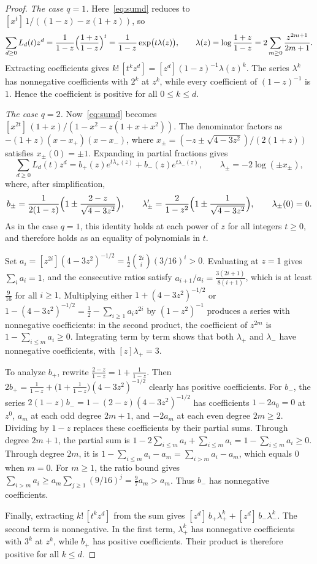 \documentclass[11pt]{amsart}
\theoremstyle{remark}
\begin{document}
\begin{proof}
\emph{The case $q=1$.} Here~\eqref{eq:sumd} reduces to
$[x^t]\,1/((1-z)-x(1+z))$, so
\[
 \sum_{d\ge0}L_d(t)z^d=\frac1{1-z}\Bigl(\frac{1+z}{1-z}\Bigr)^t
 =\frac1{1-z}\exp\bigl(t\lambda(z)\bigr),\qquad
 \lambda(z)=\log\frac{1+z}{1-z}=2\sum_{m\ge0}\frac{z^{2m+1}}{2m+1}.
\]
Extracting coefficients gives $k!\,[t^kz^d]=[z^d](1-z)^{-1}\lambda(z)^k$. The
series $\lambda^k$ has nonnegative coefficients with $2^k$ at $z^k$, while
every coefficient of $(1-z)^{-1}$ is $1$. Hence the coefficient is positive
for all $0\le k\le d$.

\emph{The case $q=2$.} Now~\eqref{eq:sumd} becomes
$[x^{2t}]\,(1+x)/(1-x^2-z(1+x+x^2))$. The denominator factors as
$-(1+z)(x-x_+)(x-x_-)$, where $x_\pm=(-z\pm\sqrt{4-3z^2})/(2(1+z))$ satisfies
$x_\pm(0)=\pm1$. Expanding in partial fractions gives
\[
 \sum_{d\ge0}L_d(t)z^d=b_+(z)e^{t\lambda_+(z)}+b_-(z)e^{t\lambda_-(z)},\qquad
 \lambda_\pm=-2\log(\pm x_\pm),
\]
where, after simplification,
\[
 b_\pm=\frac{1}{2(1-z)}\Bigl(1\pm\frac{2-z}{\sqrt{4-3z^2}}\Bigr),\qquad
 \lambda_\pm'=\frac{2}{1-z^2}\Bigl(1\pm\frac1{\sqrt{4-3z^2}}\Bigr),\qquad \lambda_\pm(0)=0.
\]
As in the case $q=1$, this identity holds at each power of $z$ for all
integers $t\ge0$, and therefore holds as an equality of polynomials in $t$.

Set $a_i=[z^{2i}](4-3z^2)^{-1/2}=\frac12\binom{2i}{i}(3/16)^i>0$. Evaluating
at $z=1$ gives $\sum_ia_i=1$, and the consecutive ratios satisfy
$a_{i+1}/a_i=\frac{3(2i+1)}{8(i+1)}$, which is at least $\frac9{16}$ for all
$i\ge1$. Multiplying either $1+(4-3z^2)^{-1/2}$ or
$1-(4-3z^2)^{-1/2}=\frac12-\sum_{i\ge1}a_iz^{2i}$ by $(1-z^2)^{-1}$ produces a
series with nonnegative coefficients: in the second product, the coefficient
of $z^{2m}$ is $1-\sum_{i\le m}a_i\ge0$. Integrating term by term shows that
both $\lambda_+$ and $\lambda_-$ have nonnegative coefficients, with
$[z]\lambda_+=3$.

To analyze $b_+$, rewrite $\frac{2-z}{1-z}=1+\frac1{1-z}$. Then
$2b_+=\frac1{1-z}+\bigl(1+\frac1{1-z}\bigr)(4-3z^2)^{-1/2}$ clearly has
positive coefficients. For $b_-$, the series
$2(1-z)b_-=1-(2-z)(4-3z^2)^{-1/2}$ has coefficients $1-2a_0=0$ at $z^0$, $a_m$
at each odd degree $2m+1$, and $-2a_m$ at each even degree $2m\ge2$. Dividing
by $1-z$ replaces these coefficients by their partial sums. Through degree
$2m+1$, the partial sum is
$1-2\sum_{i\le m}a_i+\sum_{i\le m}a_i=1-\sum_{i\le m}a_i\ge0$. Through degree
$2m$, it is $1-\sum_{i\le m}a_i-a_m=\sum_{i>m}a_i-a_m$, which equals $0$ when
$m=0$. For $m\ge1$, the ratio bound gives
$\sum_{i>m}a_i\ge a_m\sum_{j\ge1}(9/16)^j=\frac97a_m>a_m$. Thus $b_-$ has
nonnegative coefficients.

Finally, extracting $k!\,[t^kz^d]$ from the sum gives
$[z^d]\,b_+\lambda_+^k+[z^d]\,b_-\lambda_-^k$. The second term is nonnegative.
In the first term, $\lambda_+^k$ has nonnegative coefficients with $3^k$ at
$z^k$, while $b_+$ has positive coefficients. Their product is therefore
positive for all $k\le d$.
\end{proof}
\end{document}
